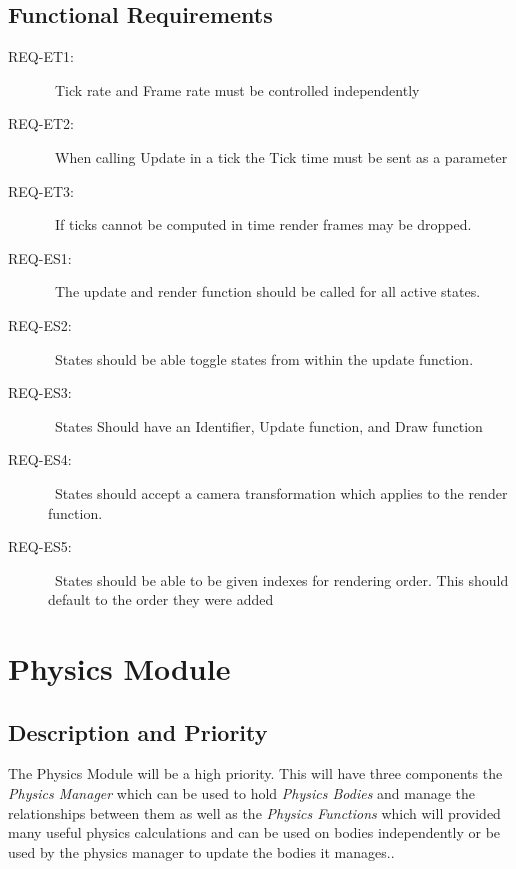 \documentclass{scrreprt}
\begin{document}
	

\subsection{Functional Requirements}

\begin{description}
\item [{REQ-ET1:}]~Tick rate and Frame rate must be controlled independently
\item [{REQ-ET2:}]~When calling Update in a tick the Tick time must be sent as a parameter
\item [{REQ-ET3:}]~If ticks cannot be computed in time render frames may be dropped.
\item [{REQ-ES1:}]~The update and render function should be called for all active states.
\item [{REQ-ES2:}]~States should be able toggle states from within the update function.
\item [{REQ-ES3:}]~States Should have an Identifier, Update function, and Draw function
\item [{REQ-ES4:}]~States should accept a camera transformation which applies to the render function.
\item [{REQ-ES5:}]~States should be able to be given indexes for rendering order.  This should default to the order they were added

\end{description}


\section{Physics Module}

\subsection{Description and Priority}
The Physics Module will be a high priority. This will have three components the \textit{Physics Manager} which can be used to hold \textit{Physics Bodies} and manage the relationships between them as well as the \textit{Physics Functions} which will provided many useful physics calculations and can be used on bodies independently or be used by the physics manager to update the bodies it manages..
\end{document}
